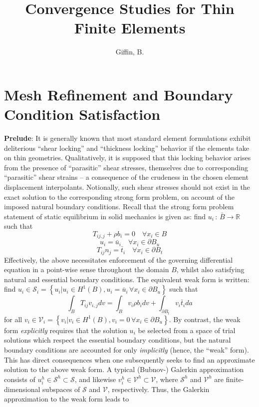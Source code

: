 \documentclass[11pt]{article} %
\title{\textbf{Convergence Studies for Thin Finite Elements}}
\author{Giffin, B.}
\begin{document}
\maketitle

\section{Mesh Refinement and Boundary Condition Satisfaction}

\textbf{Prelude}: It is generally known that most standard element formulations exhibit deliterious ``shear locking'' and ``thickness locking'' behavior if the elements take on thin geometries. Qualitatively, it is supposed that this locking behavior arises from the presence of ``parasitic'' shear stresses, themselves due to corresponding ``parasitic'' shear strains -- a consequence of the crudeness in the chosen element displacement interpolants. Notionally, such shear stresses should not exist in the exact solution to the corresponding strong form problem, on account of the imposed natural boundary conditions. Recall that the strong form problem statement of static equilibrium in solid mechanics is given as: find $u_i \, \colon \, \bar{B} \rightarrow \mathbb{R}$ such that
\begin{equation}
	T_{ij,j} + \rho b_i = 0 \quad \forall x_i \in B
\end{equation}
\begin{equation}
	u_i = \bar{u}_i \quad \forall x_i \in \partial B_u
\end{equation}
\begin{equation}
	T_{ij} n_j = \bar{t}_i \quad \forall x_i \in \partial B_t
\end{equation}
Effectively, the above necessitates enforcement of the governing differential equation in a point-wise sense throughout the domain $B$, whilst also satisfying natural and essential boundary conditions. The equivalent weak form is written: find $u_i \in \mathcal{S}_i = \left\{ u_i | u_i \in H^1 (B), u_i = \bar{u}_i \, \forall x_i \in \partial B_u \right\}$ such that
\begin{equation}
	\int_B T_{ij} v_{i,j} dv = \int_B v_i \rho b_i dv + \int_{\partial B_t} v_i \bar{t}_i da
\end{equation}
for all $v_i \in \mathcal{V}_i = \left\{ v_i | v_i \in H^1 (B), v_i = 0 \, \forall x_i \in \partial B_u \right\}$. By contrast, the weak form \textit{explicitly} requires that the solution $u_i$ be selected from a space of trial solutions which respect the essential boundary conditions, but the natural boundary conditions are accounted for only \textit{implicitly} (hence, the ``weak'' form). This has direct consequences when one subsequently seeks to find an approximate solution to the above weak form. A typical (Bubnov-) Galerkin approximation consists of $u^h_i \in \mathcal{S}^h \subset \mathcal{S}$, and likewise $v^h_i \in \mathcal{V}^h \subset \mathcal{V}$, where $\mathcal{S}^h$ and $\mathcal{V}^h$ are finite-dimensional subspaces of $\mathcal{S}$ and $\mathcal{V}$, respectively. Thus, the Galerkin approximation to the weak form leads to
\end{document}
